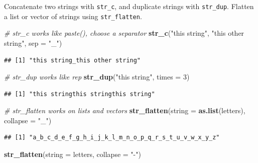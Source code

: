 \documentclass[]{book}
\newenvironment{Shaded}{}{}
\newcommand{\CommentTok}[1]{\textcolor[rgb]{0.38,0.63,0.69}{\textit{#1}}}
\newcommand{\DataTypeTok}[1]{\textcolor[rgb]{0.56,0.13,0.00}{#1}}
\newcommand{\DecValTok}[1]{\textcolor[rgb]{0.25,0.63,0.44}{#1}}
\newcommand{\KeywordTok}[1]{\textcolor[rgb]{0.00,0.44,0.13}{\textbf{#1}}}
\newcommand{\NormalTok}[1]{#1}
\newcommand{\StringTok}[1]{\textcolor[rgb]{0.25,0.44,0.63}{#1}}
\begin{document}
Concatenate two strings with \texttt{str\_c}, and duplicate strings with \texttt{str\_dup}. Flatten a list or vector of strings using \texttt{str\_flatten}.

\begin{Shaded}
\begin{Highlighting}[]
\CommentTok{# str_c works like paste(), choose a separator}
\KeywordTok{str_c}\NormalTok{(}\StringTok{"this string"}\NormalTok{, }\StringTok{"this other string"}\NormalTok{, }\DataTypeTok{sep =} \StringTok{"_"}\NormalTok{)}
\end{Highlighting}
\end{Shaded}

\begin{verbatim}
## [1] "this string_this other string"
\end{verbatim}

\begin{Shaded}
\begin{Highlighting}[]
\CommentTok{# str_dup works like rep}
\KeywordTok{str_dup}\NormalTok{(}\StringTok{"this string"}\NormalTok{, }\DataTypeTok{times =} \DecValTok{3}\NormalTok{)}
\end{Highlighting}
\end{Shaded}

\begin{verbatim}
## [1] "this stringthis stringthis string"
\end{verbatim}

\begin{Shaded}
\begin{Highlighting}[]
\CommentTok{# str_flatten works on lists and vectors}
\KeywordTok{str_flatten}\NormalTok{(}\DataTypeTok{string =} \KeywordTok{as.list}\NormalTok{(letters), }\DataTypeTok{collapse =} \StringTok{"_"}\NormalTok{)}
\end{Highlighting}
\end{Shaded}

\begin{verbatim}
## [1] "a_b_c_d_e_f_g_h_i_j_k_l_m_n_o_p_q_r_s_t_u_v_w_x_y_z"
\end{verbatim}

\begin{Shaded}
\begin{Highlighting}[]
\KeywordTok{str_flatten}\NormalTok{(}\DataTypeTok{string =}\NormalTok{ letters, }\DataTypeTok{collapse =} \StringTok{"-"}\NormalTok{)}
\end{Highlighting}
\end{Shaded}
\end{document}

